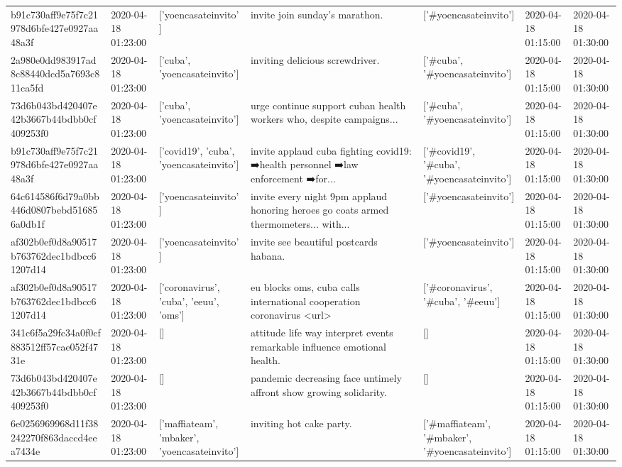 \begin{tabular}{lllllll}
b91c730aff9e75f7c21978d6bfe427e0927aa48a3f & 2020-04-18 01:23:00 & ['yoencasateinvito'] & invite join sunday's marathon. & ['#yoencasateinvito'] & 2020-04-18 01:15:00 & 2020-04-18 01:30:00 \\
2a980e0dd983917ad8c88440dcd5a7693c811ca5fd & 2020-04-18 01:23:00 & ['cuba', 'yoencasateinvito'] & inviting delicious screwdriver. & ['#cuba', '#yoencasateinvito'] & 2020-04-18 01:15:00 & 2020-04-18 01:30:00 \\
73d6b043bd420407e42b3667b44bdbb0cf409253f0 & 2020-04-18 01:23:00 & ['cuba', 'yoencasateinvito'] & urge continue support cuban health workers who, despite campaigns... & ['#cuba', '#yoencasateinvito'] & 2020-04-18 01:15:00 & 2020-04-18 01:30:00 \\
b91c730aff9e75f7c21978d6bfe427e0927aa48a3f & 2020-04-18 01:23:00 & ['covid19', 'cuba', 'yoencasateinvito'] & invite applaud cuba fighting covid19: ➡️health personnel ➡️law enforcement ➡️for... & ['#covid19', '#cuba', '#yoencasateinvito'] & 2020-04-18 01:15:00 & 2020-04-18 01:30:00 \\
64c614586f6d79a0bb446d0807bebd516856a0db1f & 2020-04-18 01:23:00 & ['yoencasateinvito'] & invite every night 9pm applaud honoring heroes go coats armed thermometers... with... & ['#yoencasateinvito'] & 2020-04-18 01:15:00 & 2020-04-18 01:30:00 \\
af302b0ef0d8a90517b763762dec1bdbcc61207d14 & 2020-04-18 01:23:00 & ['yoencasateinvito'] & invite see beautiful postcards habana. & ['#yoencasateinvito'] & 2020-04-18 01:15:00 & 2020-04-18 01:30:00 \\
af302b0ef0d8a90517b763762dec1bdbcc61207d14 & 2020-04-18 01:23:00 & ['coronavirus', 'cuba', 'eeuu', 'oms'] & eu blocks oms, cuba calls international cooperation coronavirus <url> & ['#coronavirus', '#cuba', '#eeuu'] & 2020-04-18 01:15:00 & 2020-04-18 01:30:00 \\
341c6f5a29fc34a0f0cf883512ff57cae052f4731e & 2020-04-18 01:23:00 & [] & attitude life way interpret events remarkable influence emotional health. & [] & 2020-04-18 01:15:00 & 2020-04-18 01:30:00 \\
73d6b043bd420407e42b3667b44bdbb0cf409253f0 & 2020-04-18 01:23:00 & [] & pandemic decreasing face untimely affront show growing solidarity. & [] & 2020-04-18 01:15:00 & 2020-04-18 01:30:00 \\
6e0256969968d11f38242270f863daccd4eea7434e & 2020-04-18 01:23:00 & ['maffiateam', 'mbaker', 'yoencasateinvito'] & inviting hot cake party. & ['#maffiateam', '#mbaker', '#yoencasateinvito'] & 2020-04-18 01:15:00 & 2020-04-18 01:30:00 \\

\end{tabular}
